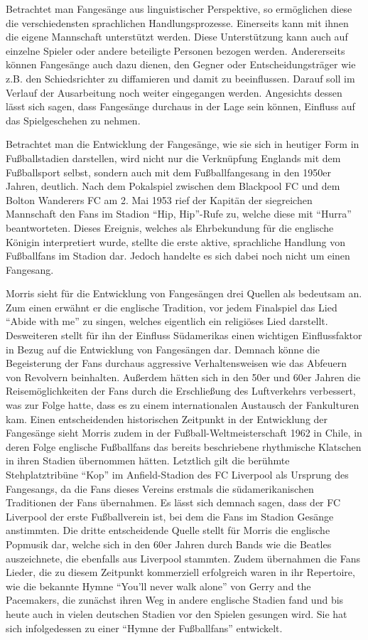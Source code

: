Betrachtet man Fangesänge aus linguistischer Perspektive, so ermöglichen diese die verschiedensten sprachlichen Handlungsprozesse.
Einerseits kann mit ihnen die eigene Mannschaft unterstützt werden.
Diese Unterstützung kann auch auf einzelne Spieler oder andere beteiligte Personen bezogen werden.
Andererseits können Fangesänge auch dazu dienen, den Gegner oder Entscheidungsträger wie z.B. den Schiedsrichter zu diffamieren und damit zu beeinflussen.
Darauf soll im Verlauf der Ausarbeitung noch weiter eingegangen werden.
Angesichts dessen lässt sich sagen, dass Fangesänge durchaus in der Lage sein können, Einfluss auf das Spielgeschehen zu nehmen.

Betrachtet man die Entwicklung der Fangesänge, wie sie sich in heutiger Form in Fußballstadien darstellen, wird nicht nur die Verknüpfung Englands mit dem Fußballsport selbst, sondern auch mit dem Fußballfangesang in den 1950er Jahren, deutlich.
Nach dem Pokalspiel zwischen dem Blackpool FC und dem Bolton Wanderers FC am 2. Mai 1953 rief der Kapitän der siegreichen Mannschaft den Fans im Stadion "`Hip, Hip"'-Rufe zu, welche diese mit "`Hurra"' beantworteten.
Dieses Ereignis, welches als Ehrbekundung für die englische Königin interpretiert wurde, stellte die erste aktive, sprachliche Handlung von Fußballfans im Stadion dar.
Jedoch handelte es sich dabei noch nicht um einen Fangesang.

Morris sieht für die Entwicklung von Fangesängen drei Quellen als bedeutsam an.
Zum einen erwähnt er die englische Tradition, vor jedem Finalspiel das Lied "`Abide with me"' zu singen, welches eigentlich ein religiöses Lied darstellt.
Desweiteren stellt für ihn der Einfluss Südamerikas einen wichtigen Einflussfaktor in Bezug auf die Entwicklung von Fangesängen dar.
Demnach könne die Begeisterung der Fans durchaus aggressive Verhaltensweisen wie das Abfeuern von Revolvern beinhalten.
Außerdem hätten sich in den 50er und 60er Jahren die Reisemöglichkeiten der Fans durch die Erschließung des Luftverkehrs verbessert, was zur Folge hatte, dass es zu einem internationalen Austausch der Fankulturen kam.
Einen entscheidenden historischen Zeitpunkt in der Entwicklung der Fangesänge sieht Morris zudem in der Fußball-Weltmeisterschaft 1962 in Chile, in deren Folge englische Fußballfans das bereits beschriebene rhythmische Klatschen in ihren Stadien übernommen hätten.
Letztlich gilt die berühmte Stehplatztribüne "`Kop"' im Anfield-Stadion des FC Liverpool als Ursprung des Fangesangs, da die Fans dieses Vereins erstmals die südamerikanischen Traditionen der Fans übernahmen.
Es lässt sich demnach sagen, dass der FC Liverpool der erste Fußballverein ist, bei dem die Fans im Stadion Gesänge anstimmten.
Die dritte entscheidende Quelle stellt für Morris die englische Popmusik dar, welche sich in den 60er Jahren durch Bands wie die Beatles auszeichnete, die ebenfalls aus Liverpool stammten.
Zudem übernahmen die Fans Lieder, die zu diesem Zeitpunkt kommerziell erfolgreich waren in ihr Repertoire, wie die bekannte Hymne "`You'll never walk alone"' von Gerry and the Pacemakers, die zunächst ihren Weg in andere englische Stadien fand und bis heute auch in vielen deutschen Stadien vor den Spielen gesungen wird.
Sie hat sich infolgedessen zu einer "`Hymne der Fußballfans"' entwickelt.

